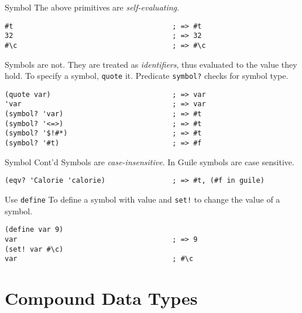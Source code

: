 \documentclass[presentation]{beamer}
\begin{document}
\begin{frame}[fragile,label={sec:orgheadline25}]{Symbol}
 The above primitives are \emph{self-evaluating}.

\begin{verbatim}
#t                                      ; => #t
32                                      ; => 32
#\c                                     ; => #\c
\end{verbatim}

Symbols are not.  They are treated as \emph{identifiers}, thus evaluated
to the value they hold. To specify a symbol, \texttt{quote} it.  Predicate
\texttt{symbol?} checks for symbol type.

\begin{verbatim}
(quote var)                             ; => var
'var                                    ; => var
(symbol? 'var)                          ; => #t
(symbol? '<=>)                          ; => #t
(symbol? '$!#*)                         ; => #t
(symbol? '#t)                           ; => #f
\end{verbatim}
\end{frame}

\begin{frame}[fragile,label={sec:orgheadline26}]{Symbol Cont'd}
 Symbols are \emph{case-insensitive}.  In Guile symbols are case
sensitive.

\begin{verbatim}
(eqv? 'Calorie 'calorie)                ; => #t, (#f in guile)
\end{verbatim}

Use \texttt{define} To define a symbol with value and \texttt{set!} to change the
value of a symbol.

\begin{verbatim}
(define var 9)
var                                     ; => 9
(set! var #\c)
var                                     ; #\c
\end{verbatim}
\end{frame}

\section{Compound Data Types}
\label{sec:orgheadline41}
\end{document}
